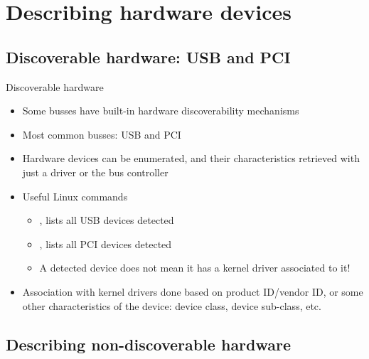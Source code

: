 \section{Describing hardware devices}

\subsection{Discoverable hardware: USB and PCI}

\begin{frame}{Discoverable hardware}
  \begin{itemize}
  \item Some busses have built-in hardware discoverability mechanisms
  \item Most common busses: USB and PCI
  \item Hardware devices can be enumerated, and their characteristics
    retrieved with just a driver or the bus controller
  \item Useful Linux commands
    \begin{itemize}
    \item {}, lists all USB devices detected
    \item {}, lists all PCI devices detected
    \item A detected device does not mean it has a kernel driver
      associated to it!
    \end{itemize}
  \item Association with kernel drivers done based on product
    ID/vendor ID, or some other characteristics of the device: device
    class, device sub-class, etc.
  \end{itemize}
\end{frame}

\subsection{Describing non-discoverable hardware}

